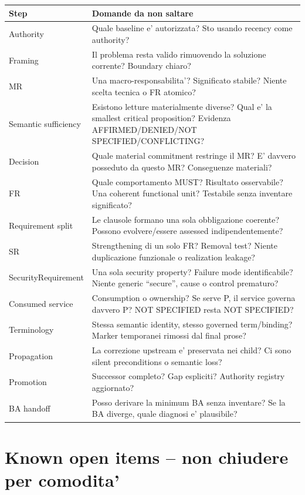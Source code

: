 \documentclass[11pt,a4paper]{article}
\begin{document}
\begin{longtable}{L{0.18\textwidth}L{0.73\textwidth}}
\toprule
\textbf{Step} & \textbf{Domande da non saltare} \\
\midrule\endhead
Authority & Quale baseline e' autorizzata? Sto usando recency come authority? \\
Framing & Il problema resta valido rimuovendo la soluzione corrente? Boundary chiaro? \\
MR & Una macro-responsabilita'? Significato stabile? Niente scelta tecnica o FR atomico? \\
Semantic sufficiency & Esistono letture materialmente diverse? Qual e' la smallest critical proposition? Evidenza AFFIRMED/DENIED/NOT SPECIFIED/CONFLICTING? \\
Decision & Quale material commitment restringe il MR? E' davvero posseduto da questo MR? Conseguenze materiali? \\
FR & Quale comportamento MUST? Risultato osservabile? Una coherent functional unit? Testabile senza inventare significato? \\
Requirement split & Le clausole formano una sola obbligazione coerente? Possono evolvere/essere assessed indipendentemente? \\
SR & Strengthening di un solo FR? Removal test? Niente duplicazione funzionale o realization leakage? \\
SecurityRequirement & Una sola security property? Failure mode identificabile? Niente generic ``secure'', cause o control prematuro? \\
Consumed service & Consumption o ownership? Se serve P, il service governa davvero P? NOT SPECIFIED resta NOT SPECIFIED? \\
Terminology & Stessa semantic identity, stesso governed term/binding? Marker temporanei rimossi dal final prose? \\
Propagation & La correzione upstream e' preservata nei child? Ci sono silent preconditions o semantic loss? \\
Promotion & Successor completo? Gap espliciti? Authority registry aggiornato? \\
BA handoff & Posso derivare la minimum BA senza inventare? Se la BA diverge, quale diagnosi e' plausibile? \\
\bottomrule
\end{longtable}

\section{Known open items -- non chiudere per comodita'}
\end{document}
